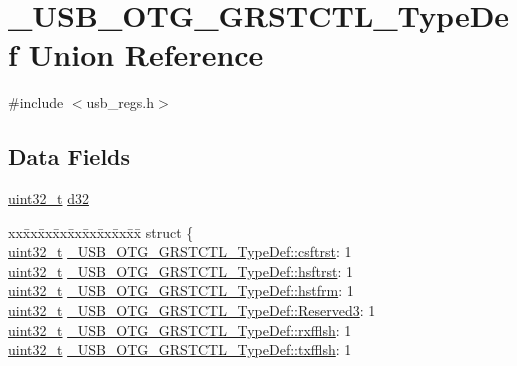 \hypertarget{union___u_s_b___o_t_g___g_r_s_t_c_t_l___type_def}{\section{\-\_\-\-U\-S\-B\-\_\-\-O\-T\-G\-\_\-\-G\-R\-S\-T\-C\-T\-L\-\_\-\-Type\-Def Union Reference}
\label{union___u_s_b___o_t_g___g_r_s_t_c_t_l___type_def}
}


{\ttfamily \#include $<$usb\-\_\-regs.\-h$>$}

\subsection*{Data Fields}
\begin{DoxyCompactItemize}
\item 
\hyperlink{stdint_8h_a435d1572bf3f880d55459d9805097f62}{uint32\-\_\-t} \hyperlink{group___u_s_b___o_t_g___d_r_i_v_e_r_ga99aa54b3bf96dc62e5a6e2f0d02b15a0}{d32}
\item 
\begin{tabbing}
xx\=xx\=xx\=xx\=xx\=xx\=xx\=xx\=xx\=\kill
struct \{\\
\>\hyperlink{stdint_8h_a435d1572bf3f880d55459d9805097f62}{uint32\_t} \hyperlink{group___u_s_b___o_t_g___d_r_i_v_e_r_gaff6144b9dc68f62487e3e19efcff1a20}{\_USB\_OTG\_GRSTCTL\_TypeDef::csftrst}: 1\\
\>\hyperlink{stdint_8h_a435d1572bf3f880d55459d9805097f62}{uint32\_t} \hyperlink{group___u_s_b___o_t_g___d_r_i_v_e_r_ga0ce950fb04d37c6bfb5ca18fc740b3d3}{\_USB\_OTG\_GRSTCTL\_TypeDef::hsftrst}: 1\\
\>\hyperlink{stdint_8h_a435d1572bf3f880d55459d9805097f62}{uint32\_t} \hyperlink{group___u_s_b___o_t_g___d_r_i_v_e_r_ga74ac2a67ad56bfb0d44539efa6dad5bc}{\_USB\_OTG\_GRSTCTL\_TypeDef::hstfrm}: 1\\
\>\hyperlink{stdint_8h_a435d1572bf3f880d55459d9805097f62}{uint32\_t} \hyperlink{group___u_s_b___o_t_g___d_r_i_v_e_r_ga3ddb35024f1d6b9df8699e9471afda72}{\_USB\_OTG\_GRSTCTL\_TypeDef::Reserved3}: 1\\
\>\hyperlink{stdint_8h_a435d1572bf3f880d55459d9805097f62}{uint32\_t} \hyperlink{group___u_s_b___o_t_g___d_r_i_v_e_r_ga1cc327f836fad208772495510703d944}{\_USB\_OTG\_GRSTCTL\_TypeDef::rxfflsh}: 1\\
\>\hyperlink{stdint_8h_a435d1572bf3f880d55459d9805097f62}{uint32\_t} \hyperlink{group___u_s_b___o_t_g___d_r_i_v_e_r_ga35e4fa074133fbed23d7c251825dc21f}{\_USB\_OTG\_GRSTCTL\_TypeDef::txfflsh}: 1\\

\end{tabbing}
\end{DoxyCompactItemize}
